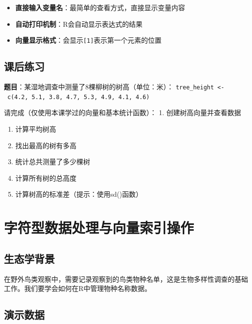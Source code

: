 \documentclass[
  twoside]{book}
\providecommand{\tightlist}{%
  \setlength{\itemsep}{0pt}\setlength{\parskip}{0pt}}
\begin{document}
\begin{itemize}
\tightlist
\item
  \textbf{直接输入变量名}：最简单的查看方式，直接显示变量内容
\item
  \textbf{自动打印机制}：R会自动显示表达式的结果
\item
  \textbf{向量显示格式}：会显示\texttt{{[}1{]}}表示第一个元素的位置
\end{itemize}

\hypertarget{ux8bfeux540eux7ec3ux4e60}{%
\subsection{课后练习}\label{ux8bfeux540eux7ec3ux4e60}}

\textbf{题目}：某湿地调查中测量了8棵柳树的树高（单位：米）：
\texttt{tree\_height\ \textless{}-\ c(4.2,\ 5.1,\ 3.8,\ 4.7,\ 5.3,\ 4.9,\ 4.1,\ 4.6)}

请完成（仅使用本课学过的向量和基本统计函数）：
1. 创建树高向量并查看数据

\begin{enumerate}
\def\labelenumi{\arabic{enumi}.}
\setcounter{enumi}{1}
\item
  计算平均树高
\item
  找出最高的树有多高
\item
  统计总共测量了多少棵树
\item
  计算所有树的总高度
\item
  计算树高的标准差（提示：使用sd()函数）
\end{enumerate}

\hypertarget{ux5b57ux7b26ux578bux6570ux636eux5904ux7406ux4e0eux5411ux91cfux7d22ux5f15ux64cdux4f5c}{%
\section{字符型数据处理与向量索引操作}\label{ux5b57ux7b26ux578bux6570ux636eux5904ux7406ux4e0eux5411ux91cfux7d22ux5f15ux64cdux4f5c}}

\hypertarget{ux751fux6001ux5b66ux80ccux666f-1}{%
\subsection{生态学背景}\label{ux751fux6001ux5b66ux80ccux666f-1}}

在野外鸟类观察中，需要记录观察到的鸟类物种名单，这是生物多样性调查的基础工作。我们要学会如何在R中管理物种名称数据。

\hypertarget{ux6f14ux793aux6570ux636e-1}{%
\subsection{演示数据}\label{ux6f14ux793aux6570ux636e-1}}
\end{document}
